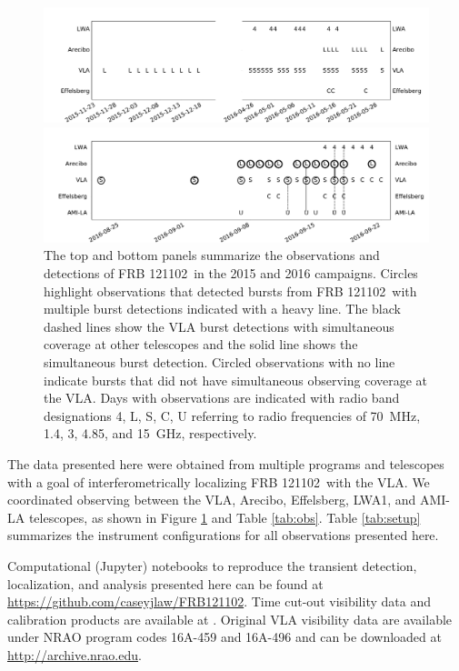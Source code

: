 \documentclass[twocolumn]{aastex61}
\newcommand{\frb}{FRB 121102}
\begin{document}
\begin{figure}[t]
\begin{center}
\includegraphics[width=2\columnwidth]{timeline0.pdf}

\includegraphics[width=2\columnwidth]{timeline.pdf}
\caption{The top and bottom panels summarize the observations and detections of \frb\ in the 2015 and 2016 campaigns. Circles highlight observations that detected bursts from \frb\ with multiple burst detections indicated with a heavy line. The black dashed lines show the VLA burst detections with simultaneous coverage at other telescopes and the solid line shows the simultaneous burst detection. Circled observations with no line indicate bursts that did not have simultaneous observing coverage at the VLA. Days with observations are indicated with radio band designations 4, L, S, C, U referring to radio frequencies of 70~MHz, 1.4, 3, 4.85, and 15~GHz, respectively.
\label{fig:sched}}
\end{center}
\end{figure}

The data presented here were obtained from multiple programs and telescopes with a goal of interferometrically localizing \frb\ with the VLA. We coordinated observing between the VLA, Arecibo, Effelsberg, LWA1, and AMI-LA telescopes, as shown in Figure \ref{fig:sched} and Table \ref{tab:obs}. Table \ref{tab:setup} summarizes the instrument configurations for all observations presented here.

Computational (Jupyter) notebooks to reproduce the transient detection, localization, and analysis presented here can be found at \url{https://github.com/caseyjlaw/FRB121102}. Time cut-out visibility data and calibration products are available at . Original VLA visibility data are available under NRAO program codes 16A-459 and 16A-496 and can be downloaded at \url{http://archive.nrao.edu}.
\end{document}
